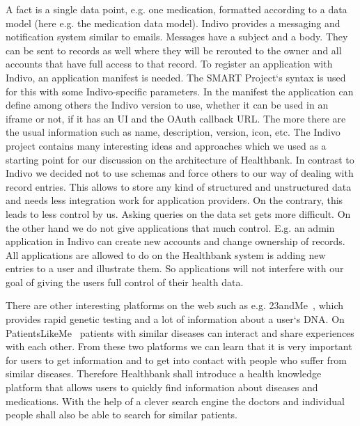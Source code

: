 A fact is a single data point, e.g. one medication, formatted according to a data model (here e.g. the medication data model). Indivo provides a messaging and notification system similar to emails. Messages have a subject and a body. They can be sent to records as well where they will be rerouted to the owner and all accounts that have full access to that record. To register an application with Indivo, an application manifest is needed. The SMART Project`s syntax is used for this with some Indivo-specific parameters. In the manifest the application can define among others the Indivo version to use, whether it can be used in an iframe or not, if it has an UI and the OAuth callback URL. The more there are the usual information such as name, description, version, icon, etc. The Indivo project contains many interesting ideas and approaches which we used as a starting point for our discussion on the architecture of Healthbank. In contrast to Indivo we decided not to use schemas and force others to our way of dealing with record entries. This allows to store any kind of structured and unstructured data and needs less integration work for application providers. On the contrary, this leads to less control by us. Asking queries on the data set gets more difficult. On the other hand we do not give applications that much control. E.g. an admin application in Indivo can create new accounts and change ownership of records. All applications are allowed to do on the Healthbank system is adding new entries to a user and illustrate them. So applications will not interfere with our goal of giving the users full control of their health data.

There are other interesting platforms on the web such as e.g. 23andMe~\cite{23andme}, which provides rapid genetic testing and a lot of information about a user`s DNA. On PatientsLikeMe~\cite{plm}\label{patientslikeme} patients with similar diseases can interact and share experiences with each other. From these two platforms we can learn that it is very important for users to get information and to get into contact with people who suffer from similar diseases. Therefore Healthbank shall introduce a health knowledge platform that allows users to quickly find information about diseases and medications. With the help of a clever search engine the doctors and individual people shall also be able to search for similar patients.

